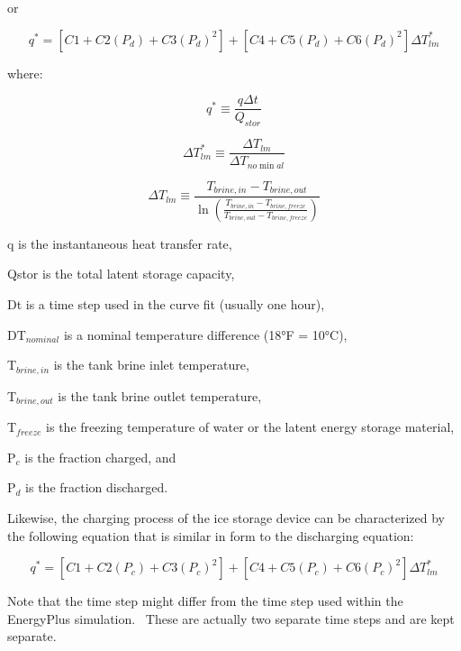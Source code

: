 or

\begin{equation}
{q^*} = \left[ {C1 + C2\left( {{P_d}} \right) + C3{{\left( {{P_d}} \right)}^2}} \right] + \left[ {C4 + C5\left( {{P_d}} \right) + C6{{\left( {{P_d}} \right)}^2}} \right]\Delta T_{lm}^*
\end{equation}

where:

\begin{equation}
{q^*} \equiv \frac{{q\Delta t}}{{{Q_{stor}}}}
\end{equation}

\begin{equation}
\Delta T_{lm}^* \equiv \frac{{\Delta {T_{lm}}}}{{\Delta {T_{no\min al}}}}
\end{equation}

\begin{equation}
\Delta {T_{lm}} \equiv \frac{{{T_{brine,in}} - {T_{brine,out}}}}{{\ln \left( {\frac{{{T_{brine,in}} - {T_{brine,freeze}}}}{{{T_{brine,out}} - {T_{brine,freeze}}}}} \right)}}
\end{equation}

q is the instantaneous heat transfer rate,

Qstor is the total latent storage capacity,

Dt is a time step used in the curve fit (usually one hour),

DT\(_{nominal}\) is a nominal temperature difference (18°F = 10°C),

T\(_{brine,in}\) is the tank brine inlet temperature,

T\(_{brine,out}\) is the tank brine outlet temperature,

T\(_{freeze}\) is the freezing temperature of water or the latent energy storage material,

P\(_{c}\) is the fraction charged, and

P\(_{d}\) is the fraction discharged.

Likewise, the charging process of the ice storage device can be characterized by the following equation that is similar in form to the discharging equation:

\begin{equation}
{q^*} = \left[ {C1 + C2\left( {{P_c}} \right) + C3{{\left( {{P_c}} \right)}^2}} \right] + \left[ {C4 + C5\left( {{P_c}} \right) + C6{{\left( {{P_c}} \right)}^2}} \right]\Delta T_{lm}^*
\end{equation}

Note that the time step might differ from the time step used within the EnergyPlus simulation.~ These are actually two separate time steps and are kept separate.

